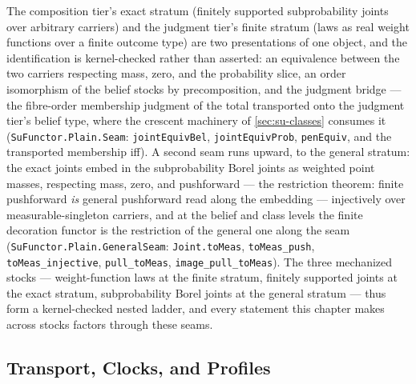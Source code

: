 \begin{remark}
\label{rem:su-seam-mechanized}
The composition tier's exact stratum (finitely supported
subprobability joints over arbitrary carriers) and the judgment
tier's finite stratum (laws as real weight functions over
a finite outcome type) are two presentations of one object, and the
identification is kernel-checked rather than asserted: an
equivalence between the two carriers respecting mass, zero, and the
probability slice, an order isomorphism of the belief stocks by
precomposition, and the judgment bridge --- the fibre-order
membership judgment of the total transported onto the judgment
tier's belief type, where the crescent machinery of
\autoref{sec:su-classes} consumes it
(\texttt{SuFunctor.Plain.Seam}: \texttt{jointEquivBel},
\texttt{jointEquivProb}, \texttt{penEquiv}, and the transported
membership iff). A second seam runs upward, to the general
stratum: the exact joints embed in the subprobability Borel joints
as weighted point masses, respecting mass, zero, and pushforward
--- the restriction theorem: finite pushforward \emph{is} general
pushforward read along the embedding --- injectively over
measurable-singleton carriers, and at the belief and class levels
the finite decoration functor is the restriction of the general
one along the seam (\texttt{SuFunctor.Plain.GeneralSeam}:
\texttt{Joint.toMeas}, \texttt{toMeas\_push},
\texttt{toMeas\_injective}, \texttt{pull\_toMeas},
\texttt{image\_pull\_toMeas}). The three mechanized stocks ---
weight-function laws at the finite stratum, finitely supported
joints at
the exact stratum, subprobability Borel joints at the general
stratum --- thus form a kernel-checked nested ladder, and every
statement this chapter makes across
stocks factors through these seams.
\end{remark}

\subsection{Transport, Clocks, and Profiles}

